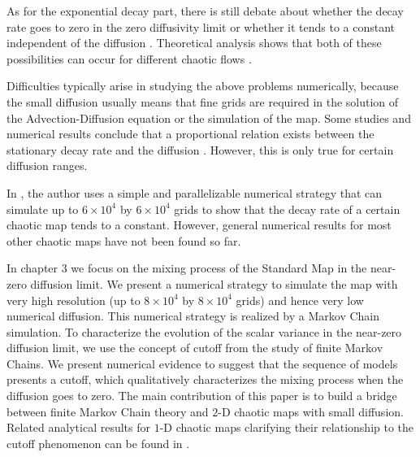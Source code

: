 
As for the exponential decay part, there is still debate about whether
the decay rate goes to zero in the zero diffusivity limit or whether
it tends to a constant independent of the diffusion
\cite{Thiffeault2004, Tsang2005}. Theoretical analysis shows that both of
these possibilities can occur for different chaotic flows
\cite{Haynes2005}.

Difficulties typically arise in studying the above problems
numerically, because the small diffusion usually means that fine grids are
required in the solution of the Advection-Diffusion equation or the
simulation of the map. Some studies and numerical results conclude that a
proportional relation exists between the stationary decay rate and the
diffusion \cite{Cerbelli2003, Pikovsky2003}. However, this is only true for
certain diffusion ranges.  


In \cite{Tsang2005}, the author
uses a simple and parallelizable numerical strategy that can simulate
up to $6 \times 10^4$ by $6 \times 10^4$ grids to show that the decay rate
of a certain chaotic map tends to a constant. However, general
numerical results for most other chaotic maps have not been found so
far.
  

In chapter 3 we focus on the mixing process of the Standard Map in
the near-zero diffusion limit. We present a numerical strategy to
simulate the map with very high resolution (up to $8 \times 10^4$ by
$8 \times 10^4$ grids) and hence very low numerical diffusion. This
numerical strategy is realized by a Markov Chain simulation. To
characterize the evolution of the scalar variance in the near-zero
diffusion limit, we use the concept of cutoff from the study of finite
Markov Chains. We present numerical evidence to suggest that the
sequence of models presents a cutoff, which qualitatively
characterizes the mixing process when the diffusion goes to zero. The
main contribution of this paper is to build a bridge between finite
Markov Chain theory and $2$-D chaotic maps with small
diffusion. Related analytical results for $1$-D chaotic maps
clarifying their relationship to the cutoff phenomenon can be found in
\cite{symdyn}.








